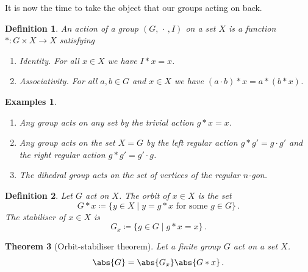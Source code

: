 \documentclass{article}
\theoremstyle{plain}\theoremheaderfont{\normalfont\itshape}\theorembodyfont{\rmfamily}\theoremseparator{.}\newtheorem*{rem}{Remark}\newtheorem*{ex}{Example}\newtheorem*{proof}{Proof}\newtheorem*{altp}{Alternative proof}
\theoremstyle{plain}\theoremheaderfont{\normalfont\bfseries}\theorembodyfont{\rmfamily}\theoremseparator{.}\newtheorem{thm}{Theorem}[section]\newtheorem{lem}[thm]{Lemma}\newtheorem{prop}[thm]{Proposition}\newtheorem*{cor}{Corollary}\newtheorem{defn}[thm]{Definition}\newtheorem{clm}[thm]{Claim}\newtheorem{clminproof}{Claim}
\theoremstyle{break}\theoremheaderfont{\normalfont\itshape}\theorembodyfont{\rmfamily}\theoremseparator{.\medskip}\newtheorem*{proofskip}{Proof}\newtheorem*{exs}{Examples}\newtheorem*{rems}{Remarks}
\theoremstyle{break}\theoremheaderfont{\normalfont\bfseries}\theorembodyfont{\rmfamily}\theoremseparator{.\medskip}\newtheorem{lemskip}[thm]{Lemma}\newtheorem{defnskip}[thm]{Definition}\newtheorem{propskip}[thm]{Proposition}\newtheorem{thmskip}[thm]{Theorem}
\numberwithin{equation}{section}
\begin{document}
	It is now the time to take the object that our groups acting on back.

	\begin{defn}
		An action of a group \((G,\,\cdot\,, I)\) on a set \(X\) is a function \( * : G\times X \to X\) satisfying
		\begin{enumerate}[topsep=0pt]
			\item[(A1)] \textit{Identity.} For all \(x \in X\) we have \(I*x=x\).
			\item[(A2)] \textit{Associativity.} For all \(a,b\in G\) and \(x\in X\) we have \((a\cdot b)*x=a*(b*x)\).
		\end{enumerate}
	\end{defn}
	\begin{exs}
		\begin{enumerate}[topsep=0pt]
			\item Any group acts on any set by the \textit{trivial action} \(g*x=x\).
			\item Any group acts on the set \(X=G\) by the \textit{left regular action} \(g*g'=g\cdot g'\) and the \textit{right regular action} \(g*g'=g'\cdot g\).
			\item The dihedral group acts on the set of vertices of the regular \(n\)-gon.
		\end{enumerate}
	\end{exs}
	\begin{defn}
		Let \(G\) act on \(X\). The \textit{orbit} of \(x\in X\) is the set
		\[G*x\coloneqq \{y\in X\mid y=g*x\text{ for some }g\in G\}\,.\]
		The \textit{stabiliser} of \(x\in X\) is
		\[G_x\coloneqq\{g\in G\mid g*x=x\}\,.\]
	\end{defn}
	\begin{thm}[Orbit-stabiliser theorem]
		Let a finite group \(G\) act on a set \(X\).
		\[\abs{G}=\abs{G_x}\abs{G*x}\,.\]	
	\end{thm}
\end{document}

